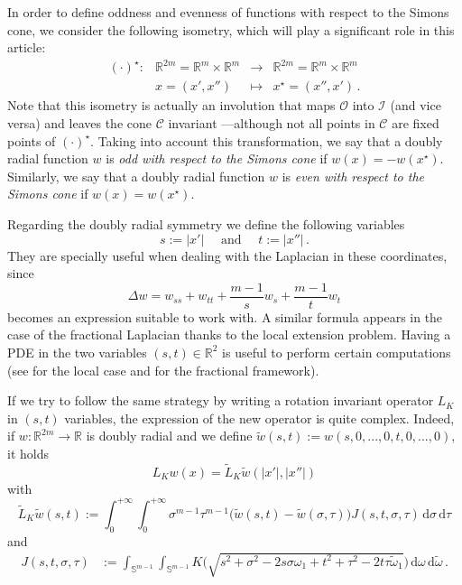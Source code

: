 \documentclass[12pt,reqno]{amsart}
\theoremstyle{definition}
\theoremstyle{remark}
\newcommand{\con}[1]{\mathbb{#1}}
\newcommand{\R}{\con{R}} %
\newcommand{\Sph}{\con{S}} %
\newcommand{\ccal}{\mathscr{C}}
\newcommand{\ical}{\mathcal{I}}
\newcommand{\ocal}{\mathcal{O}}
\renewcommand{\d}{\,\mathrm{d}} %
\numberwithin{equation}{section}
\begin{document}
In order to define oddness and evenness of functions with respect to the Simons cone, we consider the following isometry, which will play a significant role in this article:
\begin{equation}
\label{Eq:DefStar}
\begin{matrix}
(\cdot)^\star \colon & \R^{2m}= \R^{m}\times \R^{m}  &\to&  \R^{2m}= \R^{m}\times \R^{m}  \\
& x = (x',x'') &\mapsto & x^\star = (x'',x')\,.
\end{matrix}
\end{equation}
Note that this isometry is actually an involution that maps $\ocal$ into $\ical$ (and vice versa) and leaves the cone $\ccal$ invariant ---although not all points in $\ccal$ are fixed points of $(\cdot)^\star$. Taking into account this transformation, we say that a doubly radial function $w$ is \emph{odd with respect to the Simons cone} if $w(x) = -w(x^\star)$. Similarly, we say that a doubly radial function $w$ is \emph{even with respect to the Simons cone} if $w(x) = w(x^\star)$.

Regarding the doubly radial symmetry we define the following variables
$$
s := |x'| \quad \text{ and } \quad t:=|x''|\,.
$$
They are specially useful when dealing with the Laplacian in these coordinates, since
\begin{equation}
\label{Eq:Laplacian-st}
\Delta w = w_{ss} + w_{tt} + \frac{m-1}{s}w_s + \frac{m-1}{t}w_t
\end{equation}
becomes an expression suitable to work with. A similar formula appears in the case of the fractional Laplacian thanks to the local extension problem. Having a PDE in the two variables $(s,t)\in \R^2$ is useful to perform certain computations (see \cite{CabreTerraI, CabreTerraII,Cabre-Saddle, CabreRosOton-DoubleRev} for the local case and \cite{Cinti-Saddle, Cinti-Saddle2, Felipe-Sanz-Perela:SaddleFractional} for the fractional framework).

If we try to follow the same strategy by writing a rotation invariant operator $L_K$ in $(s,t)$ variables, the expression of the new operator is quite complex. Indeed, if $w:\R^{2m} \to \R$ is doubly radial and we define $\widetilde{w}(s,t) := w(s,0,...,0,t,0,...,0)$, it holds
$$ L_Kw(x) = \widetilde{L}_K \widetilde{w} (|x'|,|x''|)$$
with
\begin{equation}
\label{Eq:L_K-st}
\widetilde{L}_K \widetilde{w} (s,t) := \int_0^{+\infty}  \int_0^{+\infty} \sigma^{m-1} \tau^{m-1} \big(\widetilde{w}(s,t) - \widetilde{w}(\sigma, \tau)\big) J(s,t,\sigma, \tau)  \d \sigma\d \tau
\end{equation}
and
\begin{align*}
J(s,t,\sigma, \tau) &:= \int_{\Sph^{m-1}}  \int_{\Sph^{m-1}} K\Big( \sqrt{s^2+\sigma^2- 2 s \sigma \omega_1 + t^2 + \tau^2 - 2t \tau\tilde\omega_1}\Big) \d \omega \d \tilde\omega\,.
\end{align*}
\end{document}
